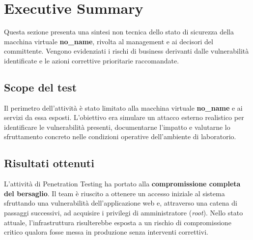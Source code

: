 \documentclass[11pt]{report}
\begin{document}
	\vspace{1cm}
	
	\newpage
	\tableofcontents
	\newpage
	

	\chapter{Executive Summary}
	Questa sezione presenta una sintesi non tecnica dello stato di sicurezza della macchina virtuale \textbf{no\_name}, rivolta al management e ai decisori del committente. Vengono evidenziati i rischi di business derivanti dalle vulnerabilità identificate e le azioni correttive prioritarie raccomandate.
	
	\section{Scope del test}
	Il perimetro dell'attività è stato limitato alla macchina virtuale \textbf{no\_name} e ai servizi da essa esposti. L'obiettivo era simulare un attacco esterno realistico per identificare le vulnerabilità presenti, documentarne l'impatto e valutarne lo sfruttamento concreto nelle condizioni operative dell'ambiente di laboratorio.
	
	\section{Risultati ottenuti}
	\begin{tcolorbox}[colback=sevCritico!5, colframe=sevCritico!80, arc=3pt, boxrule=1pt]
		L'attività di Penetration Testing ha portato alla \textbf{compromissione completa del bersaglio}. Il team è riuscito a ottenere un accesso iniziale al sistema sfruttando una vulnerabilità dell'applicazione web e, attraverso una catena di passaggi successivi, ad acquisire i privilegi di amministratore (\textit{root}). Nello stato attuale, l'infrastruttura risulterebbe esposta a un rischio di compromissione critico qualora fosse messa in produzione senza interventi correttivi.
	\end{tcolorbox}
	
\end{document}
